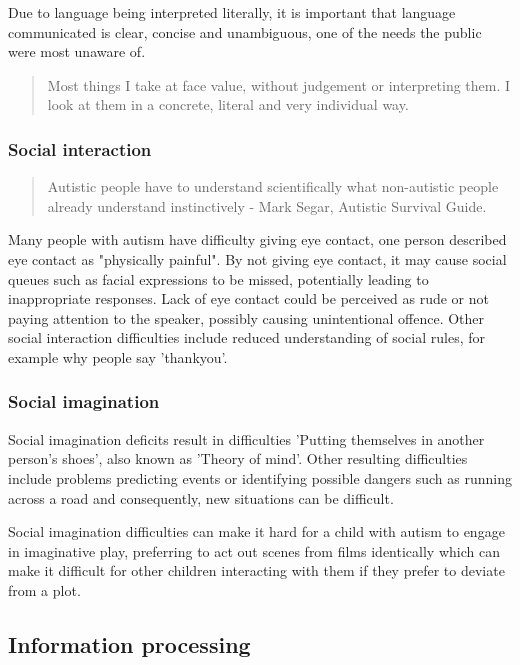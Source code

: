 \documentclass[11pt]{report}
\begin{document}
Due to language being interpreted literally, it is important that language communicated is clear, concise and unambiguous, one of the needs the public were most unaware of\cite{autismmisconception}.

\begin{quote}
Most things I take at face value, without judgement or interpreting them. I look at them in a concrete, literal and very individual way. \cite{olgab}
\end{quote}

\subsubsection*{Social interaction}

\begin{quote}
Autistic people have to understand scientifically what non-autistic people already understand instinctively 
- Mark Segar, Autistic Survival Guide.
\end{quote}

Many people with autism have difficulty giving eye contact, one person described eye contact as "physically painful". By not giving eye contact, it may cause social queues such as facial expressions to be missed, potentially leading to inappropriate responses. Lack of eye contact could be perceived as rude or not paying attention to the speaker, possibly causing unintentional offence. Other social interaction difficulties include reduced understanding of social rules\cite{nas}, for example why people say 'thankyou'.


\subsubsection*{Social imagination}
Social imagination deficits result in difficulties 'Putting themselves in another person's shoes', also known as 'Theory of mind'. Other resulting difficulties include problems predicting events or identifying possible dangers such as running across a road and consequently, new situations can be difficult.\cite{nas}

Social imagination difficulties can make it hard for a child with autism to engage in imaginative play, preferring to act out scenes from films identically which can make it difficult for other children interacting with them if they prefer to deviate from a plot.\cite{nas}

\subsection{Information processing}
\end{document}
